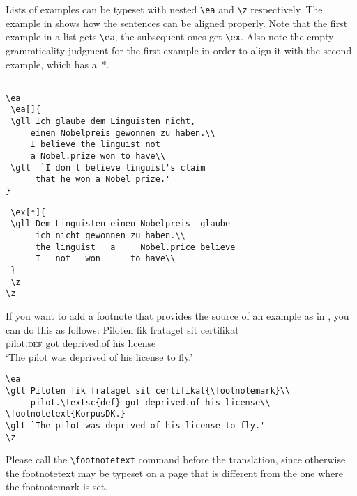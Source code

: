 Lists of examples can be typeset with nested \verb+\ea+  and \verb+\z+  respectively. The example in
 shows how the sentences can be aligned properly. Note that the first example in a list gets \verb+\ea+, the subsequent ones get \verb+\ex+. Also note the empty grammticality judgment for the first example in order to align it with the second example, which has a~*.


\ea  \label{ex:showcases:list}
\z
\z  

\begin{verbatim}

\ea 
 \ea[]{
 \gll Ich glaube dem Linguisten nicht, 
     einen Nobelpreis gewonnen zu haben.\\
     I believe the linguist not 
     a Nobel.prize won to have\\
 \glt  `I don't believe linguist's claim 
      that he won a Nobel prize.'
}
\end{verbatim}
\newpage
\begin{verbatim}
 \ex[*]{
 \gll Dem Linguisten einen Nobelpreis  glaube  
      ich nicht gewonnen zu haben.\\
      the linguist   a     Nobel.price believe 
      I   not   won      to have\\
 }
 \z
\z
\end{verbatim}
 

If you want to add a footnote that provides the source of an example as in , you can do
this as follows:
\ea\label{ex:showcases:footnote}
\gll Piloten         fik frataget    sit certifikat\footnotemark\\
     pilot.\textsc{def} got deprived.of his license\\
\glt `The pilot was deprived of his license to fly.'
\z 
\begin{verbatim}
\ea
\gll Piloten fik frataget sit certifikat{\footnotemark}\\
     pilot.\textsc{def} got deprived.of his license\\
\footnotetext{KorpusDK.}
\glt `The pilot was deprived of his license to fly.'
\z 
\end{verbatim}
Please call the \verb+\footnotetext+ command before the translation, since otherwise the
footnotetext may be typeset on a page that is different from the one where the footnotemark is set.

